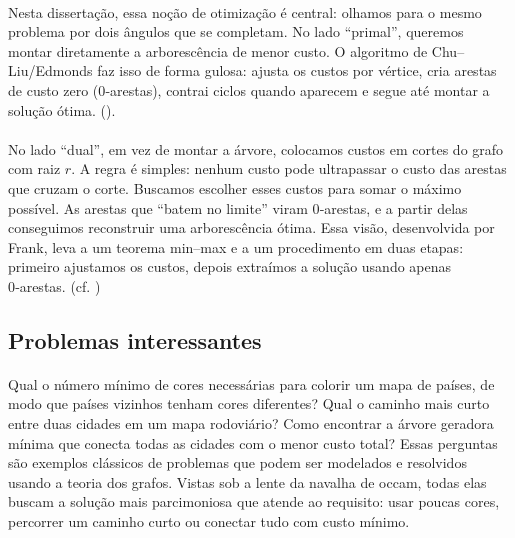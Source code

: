 \documentclass[12pt,a4paper]{article}
\begin{document}
\paragraph{}
Nesta dissertação, essa noção de otimização é central: olhamos para o mesmo problema por dois ângulos que se completam. No lado “primal”, queremos montar diretamente a arborescência de menor custo. O algoritmo de Chu–Liu/Edmonds faz isso de forma gulosa: ajusta os custos por vértice, cria arestas de custo zero (0‑arestas), contrai ciclos quando aparecem e segue até montar a solução ótima. 
(\cite{chu1965,edmonds1967optimum}).

\paragraph{}
No lado “dual”, em vez de montar a árvore, colocamos custos em cortes do grafo com raiz $r$. A regra é simples: nenhum custo pode ultrapassar o custo das arestas que cruzam o corte. Buscamos escolher esses custos para somar o máximo possível. As arestas que “batem no limite” viram 0‑arestas, e a partir delas conseguimos reconstruir uma arborescência ótima. Essa visão, desenvolvida por Frank, leva a um teorema min–max e a um procedimento em duas etapas: primeiro ajustamos os custos, depois extraímos a solução usando apenas 0‑arestas. 
(cf. \cite{frank2014,schrijver2003comb})

\subsection{Problemas interessantes}

\paragraph{}
Qual o número mínimo de cores necessárias para colorir um mapa de países, de modo que países vizinhos tenham cores diferentes? Qual o caminho mais curto entre duas cidades em um mapa rodoviário? Como encontrar a árvore geradora mínima que conecta todas as cidades com o menor custo total? Essas perguntas são exemplos clássicos de problemas que podem ser modelados e resolvidos usando a teoria dos grafos. Vistas sob a lente da navalha de occam, todas elas buscam a solução mais parcimoniosa que atende ao requisito: usar poucas cores, percorrer um caminho curto ou conectar tudo com custo mínimo.
\end{document}
